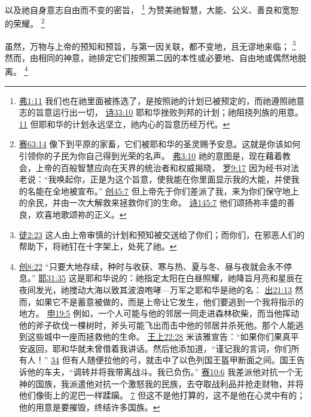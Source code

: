 \documentclass[12pt, a4paper, oneside]{ctexart}
\newcounter{parnum}[section]
\newcommand{\N}{%
   \noindent\refstepcounter{parnum}%
    \makebox[\parindent][l]{\textbf{\arabic{parnum}.}}}
\begin{document}
	以及祂自身意志自由而不变的密旨，
	\footnote {
		\href{https://biblehub.com/ephesians/1-11.htm}{弗1:11} 我们也在祂里面被拣选了，是按照祂的计划已被预定的，而祂遵照祂意志的旨意运行出一切，
		\href{https://biblehub.com/psalms/33-10.htm}{诗33:10} 耶和华挫败列邦的计划；祂阻挠列族的用意。
		\href{https://biblehub.com/psalms/33-11.htm}{11} 但耶和华的计划永远坚立，祂内心的旨意历经万代。
	}
	为赞美祂智慧，大能、公义、善良和宽恕的荣耀。
	\footnote {
		\href{https://biblehub.com/isaiah/63-14.htm}{赛63:14} 像下到平原的家畜，它们被耶和华的圣灵赐予安息。这就是你该如何引领你的子民为你自己得到光荣的名声。
		\href{https://biblehub.com/ephesians/3-10.htm}{弗3:10} 祂的意图是，现在藉着教会，上帝的百般智慧应向在天界的统治者和权威揭晓，
		\href{https://biblehub.com/romans/9-17.htm}{罗9:17} 因为经书对法老说：“我唤起你，正是为这个旨意，使我能在你里面显示我的大能，并使我的名能在全地被宣布。”
		\href{https://biblehub.com/genesis/45-7.htm}{创45:7} 但上帝先于你们差派了我，来为你们保守地上的余民，并由一次大解救来拯救你们的生命。
		\href{https://biblehub.com/psalms/145-7.htm}{诗145:7} 他们颂扬祢丰盛的善良，欢喜地歌颂祢的正义。
	}

\N 虽然，万物与上帝的预知和预旨，与第一因关联，都不变地，且无谬地来临；
	\footnote {
		\href{https://biblehub.com/acts/2-23.htm}{徒2:23} 这人由上帝审慎的计划和预知被交送给了你们；而你们，在邪恶人们的帮助下，将祂钉在十字架上，处死了祂。
	}
	然而，由相同的神意，祂排定它们按照第二因的本性或必要地、自由地或偶然地脱离。
	\footnote {
		\href{https://biblehub.com/genesis/8-22.htm}{创8:22} “只要大地存续，种时与收获、寒与热、夏与冬、昼与夜就会永不停息。”
		\href{https://biblehub.com/jeremiah/31-35.htm}{耶31:35} 这是耶和华说的：祂指定太阳在白昼照耀，祂降旨月亮和星辰在夜间发光，祂搅动大海以致其波浪咆哮---万军之耶和华是祂的名：
		\href{https://biblehub.com/exodus/21-13.htm}{出21:13} 然而，如果它不是蓄意被做的，而是上帝让它发生，他们要逃到一个我将指示的地方。
		\href{https://biblehub.com/deuteronomy/19-5.htm}{申19:5} 例如，一个人可能与他的邻居一同走进森林砍柴，而当他挥动他的斧子砍伐一棵树时，斧头可能飞出而击中他的邻居并杀死他。那个人能逃到这些城中一座而拯救他的生命。
		\href{https://biblehub.com/1_kings/22-28.htm}{王上22:28} 米该雅宣告：“如果你们果真平安返回，耶和华就未曾借着我讲话。然后他添加道，“谨记我的言词，你们所有人！”
		\href{https://biblehub.com/1_kings/22-34.htm}{34} 但有人随便拉他的弓，就击中了以色列国王盔甲断面之间。国王告诉他的车夫，“调转并将我带离战斗。我已负伤。”
		\href{https://biblehub.com/isaiah/10-6.htm}{赛10:6} 我差派他对抗一个无神的国族，我派遣他对抗一个激怒我的民族，去夺取战利品并抢走财物，并将他们像街上的泥巴一样蹂躏。
		\href{https://biblehub.com/isaiah/10-7.htm}{7} 但这不是他打算的，这不是他在心灵中有的；他的用意是要摧毁，终结许多国族。
	}
\end{document}

